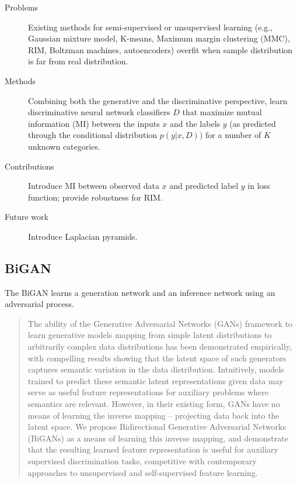 \documentclass[12pt]{utils/mydoc}
\begin{document}
\begin{description}
  \item[Problems] Existing methods for semi-supervised or unsupervised learning (e.g.,
    Gaussian mixture model, K-means, Maximum margin clustering (MMC), RIM, Boltzman 
    machines, autoencoders) overfit when sample distribution is far from real distribution.
  \item[Methods] Combining both the generative and the discriminative perspective, 
    learn discriminative neural network classifiers $D$ that maximize mutual information (MI) 
    between the inputs $x$ and the labels $y$ (as predicted through the conditional 
    distribution $p(y|x, D))$ for a number of $K$ unknown categories.
  \item[Contributions] Introduce MI between observed data $x$ and predicted label $y$ in
    loss function; provide robustness for RIM.
  \item[Future work] Introduce Laplacian pyramids.
\end{description}

\subsection{BiGAN}

The BiGAN\cite{donahue2016adversarial} learns a generation network and an inference
network using an adversarial process.

\begin{abstract}
  The ability of the Generative Adversarial Networks (GANs) framework to learn
  generative models mapping from simple latent distributions to arbitrarily complex
  data distributions has been demonstrated empirically, with compelling results
  showing that the latent space of such generators captures semantic variation in
  the data distribution. Intuitively, models trained to predict these semantic latent
  representations given data may serve as useful feature representations for auxiliary
  problems where semantics are relevant. However, in their existing form, GANs
  have no means of learning the inverse mapping – projecting data back into the
  latent space. We propose Bidirectional Generative Adversarial Networks (BiGANs)
  as a means of learning this inverse mapping, and demonstrate that the resulting
  learned feature representation is useful for auxiliary supervised discrimination tasks,
  competitive with contemporary approaches to unsupervised and self-supervised
  feature learning.
\end{abstract}
\end{document}
